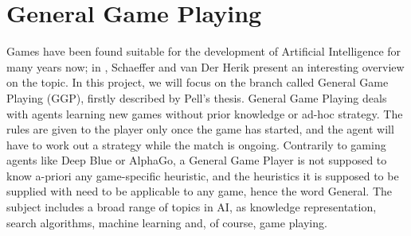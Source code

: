\section{General Game Playing}\label{sec:ggp}
Games have been found suitable for the development of Artificial Intelligence for many years now; in \cite{schaeffer2002games}, Schaeffer and van Der Herik present an interesting overview on the topic. In this project, we will focus on the branch called General Game Playing (GGP), firstly described by Pell's thesis\cite{pell1993strategy}. General Game Playing deals with agents learning new games without prior knowledge or ad-hoc strategy. The rules are given to the player only once the game has started, and the agent will have to work out a strategy while the match is ongoing. Contrarily to gaming agents like Deep Blue\cite{campbella2002deep} or AlphaGo\cite{silver2016alphago}, a General Game Player is not supposed to know a-priori any game-specific heuristic, and the heuristics it is supposed to be supplied with need to be applicable to any game, hence the word General. The subject includes a broad range of topics in AI, as knowledge representation, search algorithms, machine learning and, of course, game playing\cite{genesereth2014general}.
